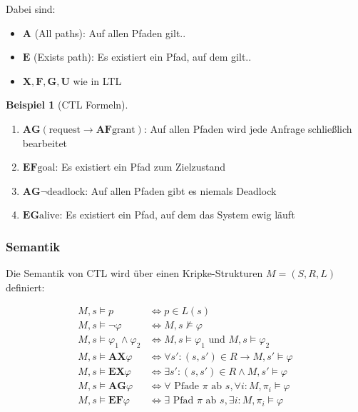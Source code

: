 ﻿\documentclass[a4paper,12pt]{article}
\theoremstyle{definition}
\newtheorem{beispiel}{Beispiel}[section]
\begin{document}
Dabei sind:
\begin{itemize}
	\item[-] $\mathbf{A}$ (All paths): Auf allen Pfaden gilt..
	\item[-] $\mathbf{E}$ (Exists path): Es existiert ein Pfad, auf dem gilt..
	\item[-] $\mathbf{X}, \mathbf{F}, \mathbf{G}, \mathbf{U}$ wie in LTL
\end{itemize}

\begin{beispiel}[CTL Formeln]
	\begin{enumerate}
		\item $\mathbf{AG}(\text{request} \to \mathbf{AF}\text{grant})$: Auf allen Pfaden wird jede Anfrage schließlich bearbeitet
		\item $\mathbf{EF}\text{goal}$: Es existiert ein Pfad zum Zielzustand
		\item $\mathbf{AG}\neg\text{deadlock}$: Auf allen Pfaden gibt es niemals Deadlock
		\item $\mathbf{EG}\text{alive}$: Es existiert ein Pfad, auf dem das System ewig läuft
	\end{enumerate}
\end{beispiel}

\subsubsection{Semantik}

Die Semantik von CTL wird über einen Kripke-Strukturen $M = (S, R, L)$ definiert:

\begin{align}
M, s \models p &\iff p \in L(s) \\
M, s \models \neg\varphi &\iff M, s \not\models \varphi \\
M, s \models \varphi_1 \land \varphi_2 &\iff M, s \models \varphi_1 \text{ und } M, s \models \varphi_2 \\
M, s \models \mathbf{AX}\varphi &\iff \forall s': (s,s') \in R \to M, s' \models \varphi \\
M, s \models \mathbf{EX}\varphi &\iff \exists s': (s,s') \in R \land M, s' \models \varphi \\
M, s \models \mathbf{AG}\varphi &\iff \forall \text{ Pfade } \pi \text{ ab } s, \forall i: M, \pi_i \models \varphi \\
M, s \models \mathbf{EF}\varphi &\iff \exists \text{ Pfad } \pi \text{ ab } s, \exists i: M, \pi_i \models \varphi
\end{align}
\end{document}

